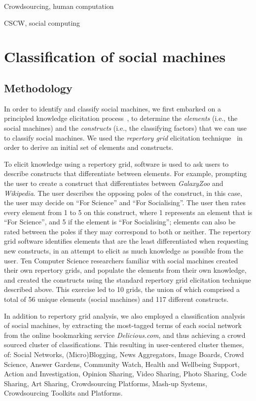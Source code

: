 \documentclass{sig-alternate}
\begin{document}
Crowdsourcing, human computation

CSCW, social computing

\section{Classification of social machines}

\subsection{Methodology}

In order to identify and classify social machines, we first embarked on a principled
knowledge elicitation process~\cite{knowledgeelicitation}, to determine the {\it elements}
(i.e., the social machines) and the {\it constructs} (i.e., the classifying factors) that
we can use to classify social machines. We used the {\it repertory grid} elicitation
technique~\cite{kelly} in order to derive an initial set of elements and constructs.

To elicit knowledge using a repertory grid, software is used to ask users to describe constructs
that differentiate between elements. For example, prompting the user to create a construct that
differentiates between {\it GalaxyZoo} and {\it Wikipedia}. The user describes the opposing poles of 
the construct, in this case, the user may decide on ``For Science'' and ``For Socialising''. The
user then rates every element from 1 to 5 on this construct, where 1 represents an element that is
``For Science'', and 5 if the element is ``For Socialising''; elements can also be rated between
the poles if they may correspond to both or neither. The repertory grid software identifies
elements that are the least differentiated when requesting new constructs, in an attempt to
elicit as much knowledge as possible from the user. Ten Computer Science researchers familiar with social machines created their own
repertory grids, and populate the elements from their own knowledge, and created the
constructs using the standard repertory grid elicitation technique described above. This exercise led
to 10 grids, the union of which comprised a total of 56 unique elements (social machines)
and 117 different constructs.

In addition to repertory grid analysis, we also employed a classification analysis of social
machines, by extracting the most-tagged terms of each social network from the online
bookmarking service {\it Delicious.com}, and thus achieving a crowd sourced cluster of
classifications. This resulting in user-centered cluster 
themes, of: Social Networks, (Micro)Blogging, News Aggregators, Image Boards, Crowd Science,
Answer Gardens, Community Watch, Health and Wellbeing Support, Action and Investigation,
Opinion Sharing, Video Sharing, Photo Sharing, Code Sharing, Art Sharing, Crowdsourcing
Platforms, Mash-up Systems, Crowdsourcing Toolkits and Platforms.
\end{document}
